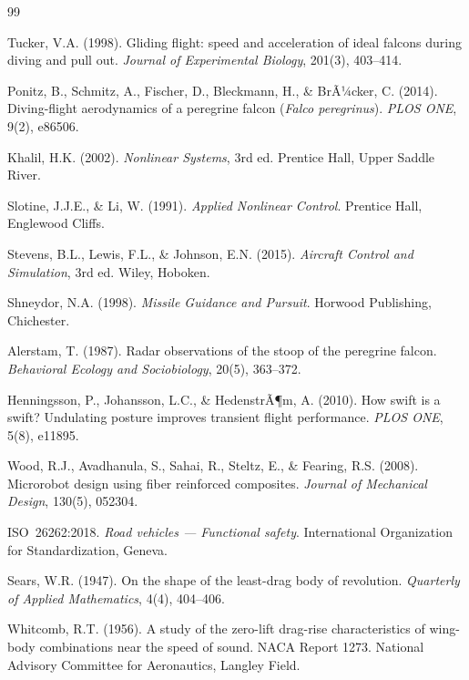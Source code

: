 ﻿\documentclass[12pt,a4paper]{article}
\theoremstyle{remark}
\begin{document}
	\begin{thebibliography}{99}
		
		Tucker, V.A. (1998). Gliding flight: speed and acceleration of ideal falcons during diving and pull out. \textit{Journal of Experimental Biology}, 201(3), 403--414.
		
		Ponitz, B., Schmitz, A., Fischer, D., Bleckmann, H., \& BrÃ¼cker, C. (2014). Diving-flight aerodynamics of a peregrine falcon (\textit{Falco peregrinus}). \textit{PLOS ONE}, 9(2), e86506.
		
		Khalil, H.K. (2002). \textit{Nonlinear Systems}, 3rd ed. Prentice Hall, Upper Saddle River.
		
		Slotine, J.J.E., \& Li, W. (1991). \textit{Applied Nonlinear Control}. Prentice Hall, Englewood Cliffs.
		
		Stevens, B.L., Lewis, F.L., \& Johnson, E.N. (2015). \textit{Aircraft Control and Simulation}, 3rd ed. Wiley, Hoboken.
		
		Shneydor, N.A. (1998). \textit{Missile Guidance and Pursuit}. Horwood Publishing, Chichester.
		
		Alerstam, T. (1987). Radar observations of the stoop of the peregrine falcon. \textit{Behavioral Ecology and Sociobiology}, 20(5), 363--372.
		
		Henningsson, P., Johansson, L.C., \& HedenstrÃ¶m, A. (2010). How swift is a swift? Undulating posture improves transient flight performance. \textit{PLOS ONE}, 5(8), e11895.
		
		Wood, R.J., Avadhanula, S., Sahai, R., Steltz, E., \& Fearing, R.S. (2008). Microrobot design using fiber reinforced composites. \textit{Journal of Mechanical Design}, 130(5), 052304.
		
		ISO~26262:2018. \textit{Road vehicles --- Functional safety}. International Organization for Standardization, Geneva.


		Sears, W.R. (1947). On the shape of the least-drag body of revolution. \textit{Quarterly of Applied Mathematics}, 4(4), 404--406.

		Whitcomb, R.T. (1956). A study of the zero-lift drag-rise characteristics of wing-body combinations near the speed of sound. NACA Report 1273. National Advisory Committee for Aeronautics, Langley Field.


\end{thebibliography}
\end{document}
